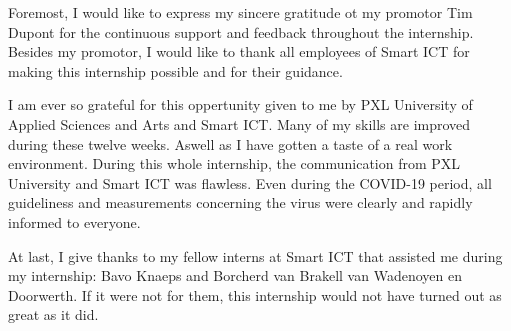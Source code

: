 Foremost, I would like to express my sincere gratitude ot my promotor Tim Dupont for the continuous support and feedback throughout the internship. Besides my promotor, I would like to thank all employees of Smart ICT for making this internship possible and for their guidance.

I am ever so grateful for this oppertunity given to me by PXL University of Applied Sciences and Arts and Smart ICT. Many of my skills are improved during these twelve weeks. Aswell as I have gotten a taste of a real work environment. During this whole internship, the communication from PXL University and Smart ICT was flawless. Even during the COVID\hyp{}19 period, all guideliness and measurements concerning the virus were clearly and rapidly informed to everyone.

At last, I give thanks to my fellow interns at Smart ICT that assisted me during my internship: Bavo Knaeps and Borcherd van Brakell van Wadenoyen en Doorwerth. If it were not for them, this internship would not have turned out as great as it did.